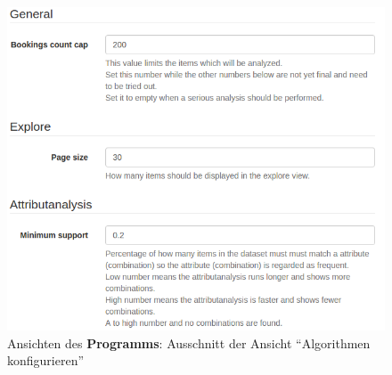 \begin{figure}[H]
	\RawFloats
	\centering
	\includegraphics[width=1\textwidth]{images/program-settings}
	\caption{Ansichten des \textbf{Programms}: Ausschnitt der Ansicht "`Algorithmen konfigurieren"'}
\end{figure}
